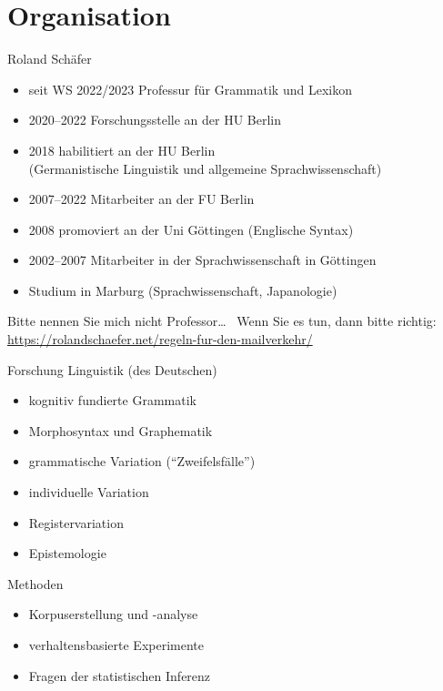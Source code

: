 
\section{Organisation}

\begin{frame}
  {Roland Schäfer}
  \onslide<+->
  \begin{itemize}[<+->]
    \item seit WS 2022\slash 2023 Professur für Grammatik und Lexikon
    \item 2020--2022 Forschungsstelle an der HU Berlin
    \item 2018 habilitiert an der HU Berlin\\
      (Germanistische Linguistik und allgemeine Sprachwissenschaft)
    \item 2007--2022 Mitarbeiter an der FU Berlin
    \item 2008 promoviert an der Uni Göttingen (Englische Syntax)
    \item 2002--2007 Mitarbeiter in der Sprachwissenschaft in Göttingen
    \item Studium in Marburg (Sprachwissenschaft, Japanologie)
  \end{itemize}
  \Zeile
  \onslide<+->
  Bitte nennen Sie mich nicht Professor\ldots\ \onslide<+-> Wenn Sie es tun, dann bitte richtig:\\
  \url{https://rolandschaefer.net/regeln-fur-den-mailverkehr/}
\end{frame}

\begin{frame}
  {Forschung}
  \onslide<+->
  Linguistik (des Deutschen)\\
  \Halbzeile
  \onslide<+->
  \begin{itemize}[<+->]
    \item kognitiv fundierte Grammatik
    \item Morphosyntax und Graphematik
    \item grammatische Variation ("`Zweifelsfälle"')
    \item individuelle Variation
    \item Registervariation
    \item Epistemologie
  \end{itemize}
  \Zeile
  \onslide<+->
  Methoden\\
  \Halbzeile
  \onslide<+->
  \begin{itemize}[<+->]
    \item Korpuserstellung und -analyse
    \item verhaltensbasierte Experimente
    \item Fragen der statistischen Inferenz
  \end{itemize}
\end{frame}

